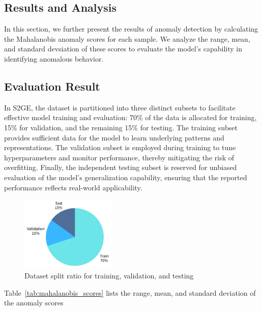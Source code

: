\begin{ZhChapter}

    \chapter{Results and Analysis}

    In this section, we further present the results of anomaly detection by calculating the Mahalanobis anomaly scores for each sample. We analyze the range, mean, and standard devsiation of these scores to evaluate the model's capability in identifying anomalous behavior.

    \section{Evaluation Result}



    In S2GE, the dataset is partitioned into three distinct subsets to facilitate effective model training and evaluation: 70\% of the data is allocated for training, 15\% for validation, and the remaining 15\% for testing. The training subset provides sufficient data for the model to learn underlying patterns and representations. The validation subset is employed during training to tune hyperparameters and monitor performance, thereby mitigating the risk of overfitting. Finally, the independent testing subset is reserved for unbiased evaluation of the model's generalization capability, ensuring that the reported performance reflects real-world applicability.
    \begin{figure}[htbp]
        \centering
        \includegraphics[width = 0.4\textwidth]{image/TrainPresentation.png}
        \caption{Dataset split ratio for training, validation, and testing}
        \label{fig:3133}
    \end{figure}



    Table~\ref{tab:mahalanobis_scores} lists the range, mean, and standard deviation of the anomaly scores



\end{ZhChapter}
